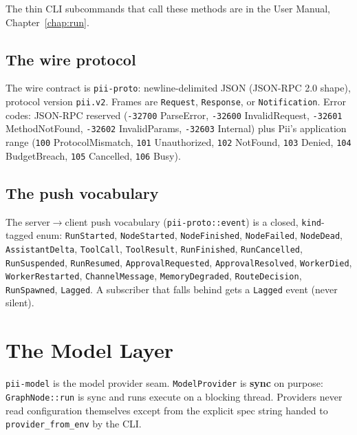\documentclass[
	fontsize=10pt,
	twoside=false,
	secnumdepth=2,
	open=any,
]{kaobook}
\begin{document}
The thin CLI subcommands that call these methods are in the User Manual,
Chapter~\ref{chap:run}.

\section{The wire protocol}

The wire contract is \texttt{pii-proto}: newline-delimited JSON (JSON-RPC
2.0 shape), protocol version \texttt{pii.v2}. Frames are
\texttt{Request}, \texttt{Response}, or \texttt{Notification}. Error
codes: JSON-RPC reserved (\texttt{-32700} ParseError, \texttt{-32600}
InvalidRequest, \texttt{-32601} MethodNotFound, \texttt{-32602}
InvalidParams, \texttt{-32603} Internal) plus Pii's application range
(\texttt{100} ProtocolMismatch, \texttt{101} Unauthorized, \texttt{102}
NotFound, \texttt{103} Denied, \texttt{104} BudgetBreach, \texttt{105}
Cancelled, \texttt{106} Busy).

\section{The push vocabulary}

The server$\rightarrow$client push vocabulary (\texttt{pii-proto::event})
is a closed, \texttt{kind}-tagged enum: \texttt{RunStarted},
\texttt{NodeStarted}, \texttt{NodeFinished}, \texttt{NodeFailed},
\texttt{NodeDead}, \texttt{AssistantDelta}, \texttt{ToolCall},
\texttt{ToolResult}, \texttt{RunFinished}, \texttt{RunCancelled},
\texttt{RunSuspended}, \texttt{RunResumed}, \texttt{ApprovalRequested},
\texttt{ApprovalResolved}, \texttt{WorkerDied}, \texttt{WorkerRestarted},
\texttt{ChannelMessage}, \texttt{MemoryDegraded}, \texttt{RouteDecision},
\texttt{RunSpawned}, \texttt{Lagged}. A subscriber that falls behind gets
a \texttt{Lagged} event (never silent).

\chapter{The Model Layer}
\label{chap:model}

\texttt{pii-model} is the model provider seam. \texttt{ModelProvider} is
\textbf{sync} on purpose: \texttt{GraphNode::run} is sync and runs execute
on a blocking thread. Providers never read configuration themselves except
from the explicit spec string handed to \texttt{provider\_from\_env} by
the CLI.
\end{document}
